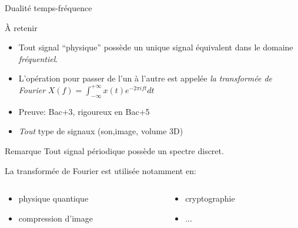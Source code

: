 \documentclass{beamer}
\begin{document}
\begin{frame}{Dualité temps-fréquence}
  \begin{alertblock}{À retenir}
    \begin{itemize}[<+->]
      \item Tout signal ``physique'' possède un unique signal équivalent dans le domaine \emph{fréquentiel}.
      \item L'opération pour passer de l'un à l'autre est appelée \emph{la transformée de Fourier}
        $X(f)=\int_{-\infty}^{+\infty}x(t)e^{-2\pi i ft}d t$
    \end{itemize}
  \end{alertblock}
  \begin{itemize}[<+->]
    \item Preuve: Bac+3, rigoureux en Bac+5
    \item \emph{Tout} type de signaux (son,image, volume 3D)
  \end{itemize}\pause
  \begin{block}{Remarque}
    Tout signal périodique possède un spectre discret.
  \end{block}\pause
  La transformée de Fourier est utilisée notamment en:
  \begin{columns}
    \begin{column}{0.5\textwidth}
      \begin{itemize}[<+->]
        \item physique quantique
        \item compression d'image
      \end{itemize}
    \end{column}
    \begin{column}{0.5\textwidth}
      \begin{itemize}[<+->]
        \item cryptographie
        \item ...
      \end{itemize}
    \end{column}
  \end{columns}

\end{frame}
\end{document}
